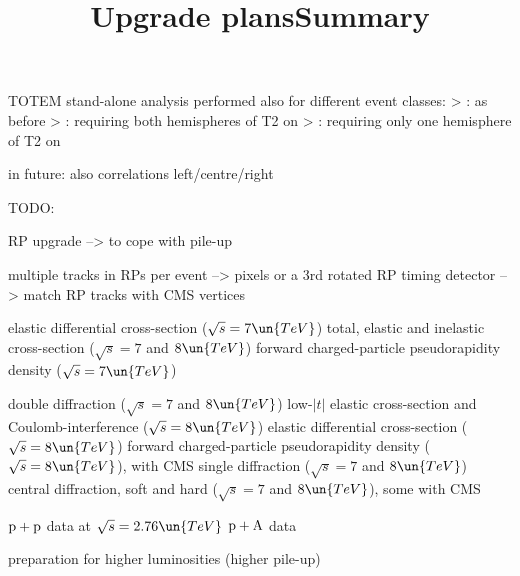 \> TOTEM stand-alone analysis performed also for different event classes:
\>> : as before
\>> : requiring both hemispheres of T2 on
\>> : requiring only one hemisphere of T2 on

\vskip2mm

\vfil
\> in future: also correlations left/centre/right

\newpage %
\title{Upgrade plans}

TODO:

RP upgrade --> to cope with pile-up

\> multiple tracks in RPs per event --> pixels or a 3rd rotated RP
\> timing detector --> match RP tracks with CMS vertices

\newpage %
\title{Summary}

\noindent{}

\> elastic differential cross-section ($\sqrt s = 7\un{TeV}$)
\> total, elastic and inelastic cross-section ($\sqrt s = 7$ and $8\un{TeV}$)
\> forward charged-particle pseudorapidity density ($\sqrt s = 7\un{TeV}$)

\vfil
\noindent{}

\> double diffraction ($\sqrt s = 7$ and $8\un{TeV}$)
\> low-$|t|$ elastic cross-section and Coulomb-interference ($\sqrt s = 8\un{TeV}$)
\> elastic differential cross-section ($\sqrt s = 8\un{TeV}$)
\> forward charged-particle pseudorapidity density ($\sqrt s = 8\un{TeV}$), with CMS
\> single diffraction ($\sqrt s = 7$ and $8\un{TeV}$)
\> central diffraction, soft and hard ($\sqrt s = 7$ and $8\un{TeV}$), some with CMS


\vfil
\noindent{}

\> $\rm p + p$ data at $\sqrt s = 2.76\un{TeV}$
\> $\rm p + A$ data



\vfil
\noindent{}
\> preparation for higher luminosities (higher pile-up)

\vfil
\eject
\bye
